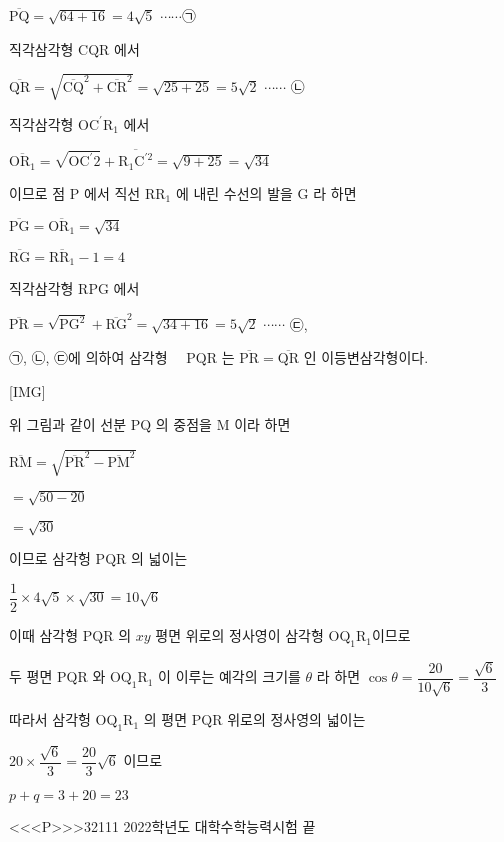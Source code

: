 \documentclass{oblivoir}
\begin{document}
$\overline{\mathrm{PQ}}=\sqrt{64+16}=4 \sqrt{5}$ $\cdots \cdots$㉠

직각삼각형 $\mathrm{CQR}$ 에서

$\overline{\mathrm{QR}}=\sqrt{\overline{\mathrm{CQ}}^{2}+\overline{\mathrm{CR}}^{2}}=\sqrt{25+25}=5 \sqrt{2}$  $\cdots \cdots$ ㉡

직각삼각형 $\mathrm{OC}^{\prime} \mathrm{R}_{1}$ 에서

$\overline{\mathrm{OR}_{1}}=\sqrt{\mathrm{OC}^{\prime} 2}+\overline{\mathrm{R}_{1} \mathrm{C}^{\prime 2}}=\sqrt{9+25}=\sqrt{34}$

이므로 점 $\mathrm{P}$ 에서 직선 $\mathrm{RR}_{1}$ 에 내린 수선의 발을 $\mathrm{G}$ 라 하면

$\overline{\mathrm{PG}}=\overline{\mathrm{OR}_{1}}=\sqrt{34}$

$\overline{\mathrm{RG}}=\overline{\mathrm{RR}_{1}}-1=4$

직각삼각형 $\mathrm{RPG}$ 에서

$\overline{\mathrm{PR}}=\sqrt{\mathrm{PG}^{2}}+\overline{\mathrm{RG}}^{2}=\sqrt{34+16}=5 \sqrt{2}$  $\cdots \cdots$ ㉢,

㉠, ㉡, ㉢에 의하여 삼각형 $\quad \mathrm{PQR}$ 는 $\overline{\mathrm{PR}}=\overline{\mathrm{QR}}$ 인 이등변삼각형이다.

[IMG]

위 그림과 같이 선분 $\mathrm{PQ}$ 의 중점을 $\mathrm{M}$ 이라 하면

$\overline{\mathrm{RM}} =\sqrt{\overline{\mathrm{PR}}^{2}-\overline{\mathrm{PM}}^{2}}$

$=\sqrt{50-20}$

$=\sqrt{30}$

이므로 삼각헝 $\mathrm{PQR}$ 의 넓이는

$\dfrac{1}{2} \times 4 \sqrt{5} \times \sqrt{30}=10 \sqrt{6}$

이때 삼각형 $\mathrm{PQR}$ 의 $x y$ 평면 위로의 정사영이 삼각형 $\mathrm{OQ}_{1} \mathrm{R}_{1}$이므로 

두 평면 $\mathrm{PQR}$ 와 $\mathrm{OQ}_{1} \mathrm{R}_{1}$ 이 이루는 예각의 크기를 $\theta$ 라 하면
$\cos \theta=\dfrac{20}{10 \sqrt{6}}=\dfrac{\sqrt{6}}{3}$

따라서 삼각헝 $\mathrm{OQ}_{1} \mathrm{R}_{1}$ 의 평면 $\mathrm{PQR}$ 위로의 정사영의 넓이는

$20 \times \dfrac{\sqrt{6}}{3}=\dfrac{20}{3} \sqrt{6}$
이므로

$p+q=3+20=23$



<<<P>>>32111 2022학년도 대학수학능력시험 끝
\end{document}
